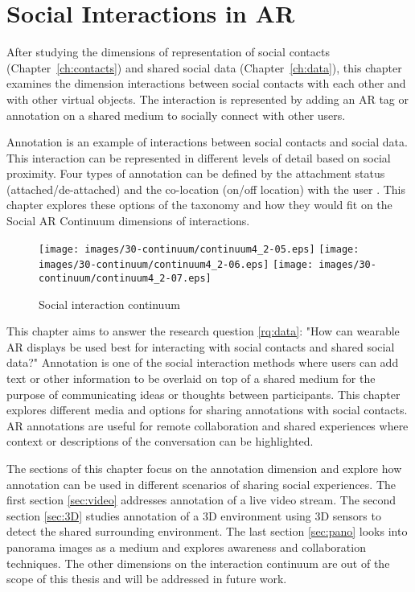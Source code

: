 \chapter{Social Interactions in AR}
\label{ch:annotation}

After studying the dimensions of representation of social contacts (Chapter~\ref{ch:contacts}) and shared social data (Chapter~\ref{ch:data}), this chapter examines the dimension interactions between social contacts with each other and with other virtual objects. The interaction is represented by adding an AR tag or annotation on a shared medium to socially connect with other users.

Annotation is an example of interactions between social contacts and social data. This interaction can be represented in different levels of detail based on social proximity. Four types of annotation can be defined by the attachment status (attached/de-attached) and the co-location (on/off location) with the user \cite{Hansen2006}. This chapter explores these options of the taxonomy and how they would fit on the Social AR Continuum dimensions of interactions. 

\begin{figure}[ht]
  \centering
  \texttt{[image: images/30-continuum/continuum4\_2-05.eps]}
  \texttt{[image: images/30-continuum/continuum4\_2-06.eps]}
  \texttt{[image: images/30-continuum/continuum4\_2-07.eps]}
  \caption{Social interaction continuum}
  \label{fig:interaction:interaction-continuum}
\end{figure}

This chapter aims to answer the research question \ref{rq:data}: "How can wearable AR displays be used best for interacting with social contacts and shared social data?"
Annotation is one of the social interaction methods where users can add text or other information to be overlaid on top of a shared medium for the purpose of communicating ideas or thoughts between participants. This chapter explores different media and options for sharing annotations with social contacts. AR annotations are useful for remote collaboration and shared experiences where context or descriptions of the conversation can be highlighted.

The sections of this chapter focus on the annotation dimension and explore how annotation can be used in different scenarios of sharing social experiences. The first section \ref{sec:video} addresses annotation of a live video stream. The second section \ref{sec:3D} studies annotation of a 3D environment using 3D sensors to detect the shared surrounding environment. The last section \ref{sec:pano} looks into panorama images as a medium and explores awareness and collaboration techniques. The other dimensions on the interaction continuum are out of the scope of this thesis and will be addressed in future work. 





